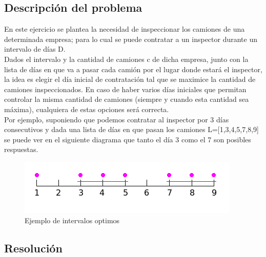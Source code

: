 \subsection{Descripci\'on del problema}

En este ejercicio se plantea la necesidad de inspeccionar los camiones de una determinada empresa; para lo cual se puede contratar a un inspector durante un intervalo de d\'ias D. \\ 
Dados el intervalo y la cantidad de camiones c de dicha empresa, junto con la lista de d\'ias en que va a pasar cada cami\'on por el lugar donde estar\'a el inspector, la idea es elegir el d\'ia inicial de contrataci\'on tal que se maximice la cantidad de camiones inspeccionados. En caso de haber varios d\'ias iniciales que permitan controlar la misma cantidad de camiones (siempre y cuando esta cantidad sea m\'axima), cualquiera de estas opciones ser\'a correcta. \\

Por ejemplo, suponiendo que podemos contratar al inspector por 3 d\'ias consecutivos y dada una lista de d\'ias en que pasan los camiones L=[1,3,4,5,7,8,9] se puede ver en el siguiente diagrama que tanto el d\'ia 3 como el 7 son posibles respuestas.\\

\begin{figure}[h]
\begin{center}
\includegraphics[scale=0.7]{./img/ej1_intervalo.png}
\caption{Ejemplo de intervalos optimos}
\end{center}
\end{figure}

\subsection{Resoluci\'on}

